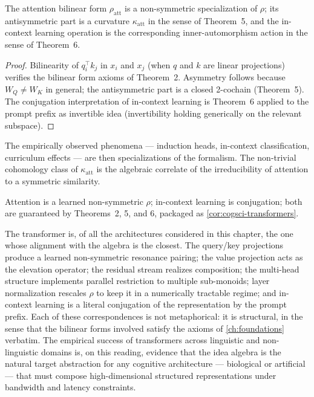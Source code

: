 \begin{corollary}\label{cor:cogsci-transformers}
The attention bilinear form $\rho_{\mathrm{att}}$ is a non-symmetric
specialization of $\rho$; its antisymmetric part is a curvature
$\kappa_{\mathrm{att}}$ in the sense of Theorem~5, and the in-context
learning operation is the corresponding inner-automorphism action in the
sense of Theorem~6.
\end{corollary}

\begin{proof}
Bilinearity of $q_i^\top k_j$ in $x_i$ and $x_j$ (when $q$ and $k$ are
linear projections) verifies the bilinear form axioms of Theorem~2.
Asymmetry follows because $W_Q\ne W_K$ in general; the antisymmetric part
is a closed 2-cochain (Theorem~5). The conjugation interpretation of
in-context learning is Theorem~6 applied to the prompt prefix as
invertible idea (invertibility holding generically on the relevant
subspace). \qedhere
\end{proof}

The empirically observed phenomena --- induction heads, in-context
classification, curriculum effects --- are then specializations of the
formalism. The non-trivial cohomology class of $\kappa_{\mathrm{att}}$ is
the algebraic correlate of the irreducibility of attention to a symmetric
similarity.

\formalstatus Attention is a learned non-symmetric $\rho$; in-context
learning is conjugation; both are guaranteed by Theorems~2, 5, and 6,
packaged as \cref{cor:cogsci-transformers}.

\litcomment The transformer is, of all the architectures considered in
this chapter, the one whose alignment with the algebra is the closest.
The query/key projections produce a learned non-symmetric resonance
pairing; the value projection acts as the elevation operator; the
residual stream realizes composition; the multi-head structure
implements parallel restriction to multiple sub-monoids; layer
normalization rescales $\rho$ to keep it in a numerically tractable
regime; and in-context learning is a literal conjugation of the
representation by the prompt prefix. Each of these correspondences is
not metaphorical: it is structural, in the sense that the bilinear
forms involved satisfy the axioms of \cref{ch:foundations} verbatim.
The empirical success of transformers across linguistic and
non-linguistic domains is, on this reading, evidence that the idea
algebra is the natural target abstraction for any cognitive
architecture --- biological or artificial --- that must compose
high-dimensional structured representations under bandwidth and
latency constraints.

